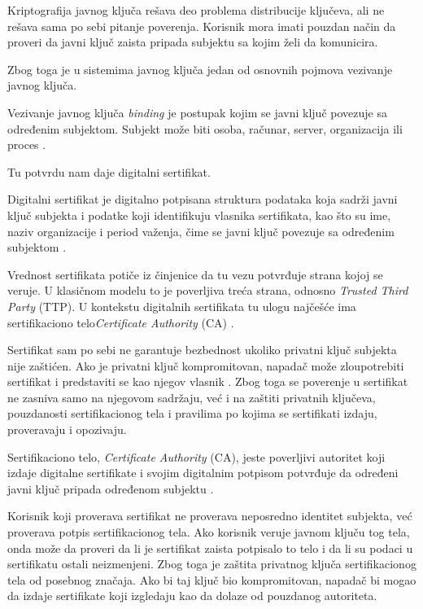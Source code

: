 Kriptografija javnog ključa rešava deo problema distribucije ključeva, ali ne rešava sama po sebi pitanje poverenja. Korisnik mora imati pouzdan način da proveri da javni ključ zaista pripada subjektu sa kojim želi da komunicira.

Zbog toga je u sistemima javnog ključa jedan od osnovnih pojmova vezivanje javnog ključa.

\begin{definition}
Vezivanje javnog ključa \emph{binding} je postupak kojim se javni ključ povezuje sa određenim subjektom. Subjekt može biti osoba, računar, server, organizacija ili proces \cite{smart2016cryptography}.
\end{definition}

Tu potvrdu nam daje digitalni sertifikat.

\begin{definition}
Digitalni sertifikat je digitalno potpisana struktura podataka koja sadrži javni ključ subjekta i podatke koji identifikuju vlasnika sertifikata, kao što su ime, naziv organizacije i period važenja, čime se javni ključ povezuje sa određenim subjektom \cite{rfc5280,ibmDigitalCertificates}.
\end{definition}

Vrednost sertifikata potiče iz činjenice da tu vezu potvrđuje strana kojoj se veruje. U klasičnom modelu to je poverljiva treća strana, odnosno \emph{Trusted Third Party} (TTP). U kontekstu digitalnih sertifikata tu ulogu najčešće ima sertifikaciono telo\emph{Certificate Authority} (CA) \cite{smart2016cryptography}.

Sertifikat sam po sebi ne garantuje bezbednost ukoliko privatni ključ subjekta nije zaštićen. Ako je privatni ključ kompromitovan, napadač može zloupotrebiti sertifikat i predstaviti se kao njegov vlasnik \cite{ibmDigitalCertificates}. Zbog toga se poverenje u sertifikat ne zasniva samo na njegovom sadržaju, već i na zaštiti privatnih ključeva, pouzdanosti sertifikacionog tela i pravilima po kojima se sertifikati izdaju, proveravaju i opozivaju.

\begin{definition}
Sertifikaciono telo, \emph{Certificate Authority} (CA), jeste poverljivi autoritet koji izdaje digitalne sertifikate i svojim digitalnim potpisom potvrđuje da određeni javni ključ pripada određenom subjektu \cite{smart2016cryptography}.
\end{definition}

Korisnik koji proverava sertifikat ne proverava neposredno identitet subjekta, već proverava potpis sertifikacionog tela. Ako korisnik veruje javnom ključu tog tela, onda može da proveri da li je sertifikat zaista potpisalo to telo i da li su podaci u sertifikatu ostali neizmenjeni. Zbog toga je zaštita privatnog ključa sertifikacionog tela od posebnog značaja. Ako bi taj ključ bio kompromitovan, napadač bi mogao da izdaje sertifikate koji izgledaju kao da dolaze od pouzdanog autoriteta.

